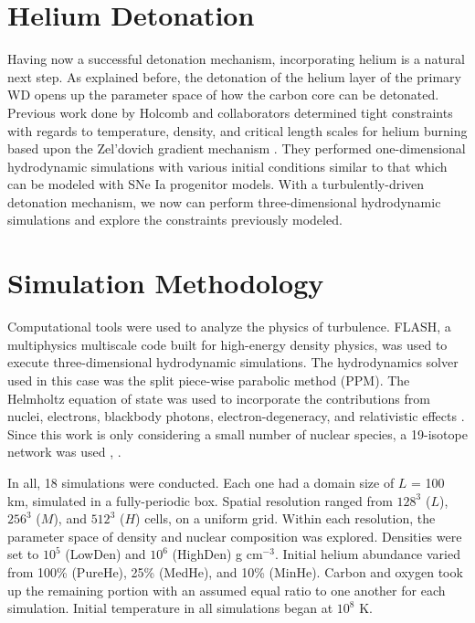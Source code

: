 \documentclass{aastex63}
\begin{document}
\section{Helium Detonation}

Having now a successful detonation mechanism, incorporating helium is a natural next step. As explained before, the detonation of the helium layer of the primary WD opens up the parameter space of how the carbon core can be detonated. Previous work done by Holcomb and collaborators determined tight constraints with regards to temperature, density, and critical length scales for helium burning based upon the Zel'dovich gradient mechanism \cite{holcomb}. They performed one-dimensional hydrodynamic simulations with various initial conditions similar to that which can be modeled with SNe Ia progenitor models. With a turbulently-driven detonation mechanism, we now can perform three-dimensional hydrodynamic simulations and explore the constraints previously modeled.

\section{Simulation Methodology}

Computational tools were used to analyze the physics of turbulence. FLASH, a multiphysics multiscale code built for high-energy density physics, was used to execute three-dimensional hydrodynamic simulations. The hydrodynamics solver used in this case was the split piece-wise parabolic method (PPM). The Helmholtz equation of state was used to incorporate the contributions from nuclei, electrons, blackbody photons, electron-degeneracy, and relativistic effects \cite{timmeswoosley92}. Since this work is only considering a small number of nuclear species, a 19-isotope network was used \cite{weaveretal78}, \cite{timmes99}.

In all, 18 simulations were conducted. Each one had a domain size of $L$ = 100 km, simulated in a fully-periodic box. Spatial resolution ranged from $128^3$ ($L$), $256^3$ ($M$), and $512^3$ ($H$) cells, on a uniform grid. Within each resolution, the parameter space of density and nuclear composition was explored. Densities were set to $10^5$ (LowDen) and $10^6$ (HighDen) g cm$^{-3}$. Initial helium abundance varied from 100\% (PureHe), 25\% (MedHe), and 10\% (MinHe). Carbon and oxygen took up the remaining portion with an assumed equal ratio to one another for each simulation. Initial temperature in all simulations began at $10^8$ K.
\end{document}
